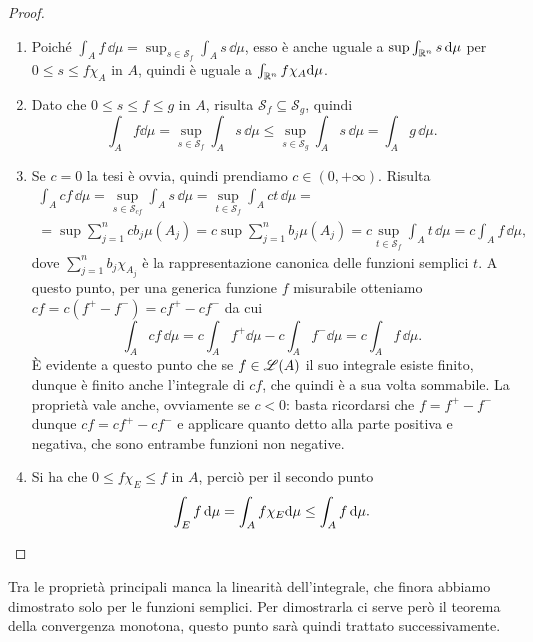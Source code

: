 \begin{proof}
	\begin{enumerate}
		\item Poich\'e $\int_Af\,\dd\mu=\sup_{s\in\mathcal S_f}\int_As\,\dd\mu$, esso è anche uguale a $\sup\int_{\mathbb{R}^n}s\,\textup{d}\mu$ per $0\leq s\leq f\chi_A$ in $A$, quindi è uguale a $\int_{\mathbb{R}^n}f\chi_A\textup{d}\mu$.
		\item Dato che $0\leq s\leq f\leq g$ in $A$, risulta $\mathcal S_f\subseteq\mathcal S_g$, quindi
			\begin{equation}
				\int_Af\dd\mu=\sup_{s\in\mathcal S_f}\int_As\,\dd\mu\leq\sup_{s\in\mathcal S_g}\int_As\,\dd\mu=\int_Ag\,\dd\mu.
			\end{equation}
		\item Se $c=0$ la tesi è ovvia, quindi prendiamo $c\in(0,+\infty)$.
			Risulta
			\begin{multline}
				\int_Acf\,\dd\mu=\sup_{s\in\mathcal S_{cf}}\int_As\,\dd\mu=\sup_{t\in\mathcal S_f}\int_Act\,\dd\mu=\\
				=\sup\sum_{j=1}^ncb_j\mu(A_j)=c\sup\sum_{j=1}^nb_j\mu(A_j)=c\sup_{t\in\mathcal S_f}\int_At\,\dd\mu=c\int_Af\,\dd\mu,
			\end{multline}
			dove $\sum_{j=1}^nb_j\chi_{A_j}$ è la rappresentazione canonica delle funzioni semplici $t$.
			A questo punto, per una generica funzione $f$ misurabile otteniamo $cf=c(f^+-f^-)=cf^+-cf^-$ da cui
			\begin{equation}
				\int_Acf\,\dd\mu=c\int_Af^+\dd\mu-c\int_Af^-\dd\mu=c\int_Af\,\dd\mu.
			\end{equation}
			È evidente a questo punto che se $f\in\mathscr L(A)$ il suo integrale esiste finito, dunque è finito anche l'integrale di $cf$, che quindi è a sua volta sommabile.
			La proprietà vale anche, ovviamente se $c<0$: basta ricordarsi che $f=f^+-f^-$ dunque $cf=cf^+-cf^-$ e applicare quanto detto alla parte positiva e negativa, che sono entrambe funzioni non negative.
		\item Si ha che $0\leq f\chi_E\leq f$ in $A$, perciò per il secondo punto
			\begin{equation}
				\int_Ef\,\textup{d}\mu=\int_Af\chi_E\textup{d}\mu\leq \int_Af\,\textup{d}\mu.\qedhere
			\end{equation}
	\end{enumerate}
\end{proof}
Tra le proprietà principali manca la linearità dell'integrale, che finora abbiamo dimostrato solo per le funzioni semplici.
Per dimostrarla ci serve però il teorema della convergenza monotona, questo punto sarà quindi trattato successivamente.

